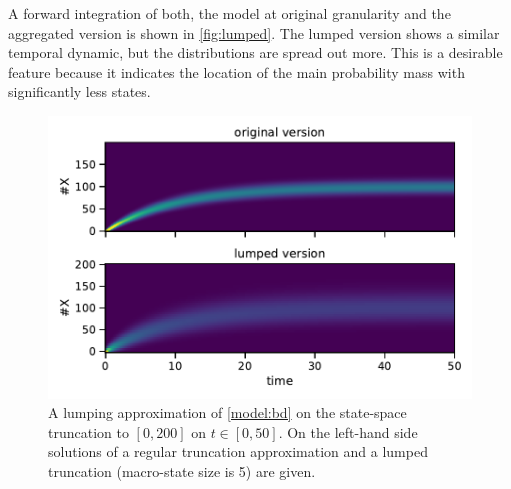 \begin{example}
A forward integration of both, the model at original granularity and the aggregated version
is shown in \autoref{fig:lumped}.
The lumped version shows a similar temporal dynamic, but the distributions are spread out more.
This is a desirable feature because it indicates the location of the main probability mass with
significantly less states.
\begin{figure}[htb]
    \centering
    \includegraphics[scale=.6]{gfx/lumpedvorig.pdf}
	\caption[Lumping approximation of \autoref{model:bd}]{A lumping approximation of \autoref{model:bd} on the state-space truncation to $[0, 200]$ on $t\in[0, 50]$. On the left-hand side solutions of a regular truncation approximation and a lumped truncation (macro-state size is 5) are given.}
    \label{fig:lumped}
\end{figure}
\end{example}
